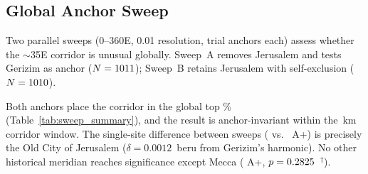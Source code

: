 \documentclass[HARVARD,twocolumn]{USG}
\begin{document}
\subsection{Global Anchor Sweep}
\label{sec:sensitivity_global}

Two parallel sweeps (0--360\textdegree{}E, 0.01\textdegree{} resolution,
\anchorSweepNanchors{} trial anchors each) assess whether the
$\sim$35\textdegree{}E corridor is unusual globally.
Sweep~A removes Jerusalem and tests Gerizim as anchor ($N = 1011$);
Sweep~B retains Jerusalem with self-exclusion ($N = 1010$).

\begin{table}[!t]
\centering\small
\caption{Global anchor sweep: both Levantine anchors ranked within their
  own corpus. Each sweep: \anchorSweepNanchors{} trial anchors,
  0--360\textdegree{}E at 0.01\textdegree{} resolution.
  Sweep~A: N\,=\,\NgerizimSweepCorpus{} (Jerusalem removed); Sweep~B: N\,=\,\NjerSelfExclCorpus{} (Jerusalem self-excluded).
  Gerizim is external in both.
  Mean A+ across all anchors: \anchorSweepApMean{}$\pm$\anchorSweepApStd{}.}
\label{tab:sweep_summary}
\end{table}

Both anchors place the corridor in the global top \anchorSweepTopPct\% 
(Table~\ref{tab:sweep_summary}), and the result
is anchor-invariant within the \GerizimJerusalemKm\,km corridor window.
The single-site difference between sweeps (\GerizimSweepAp{} vs.\ \JerusalemSweepAp{} A+) is precisely
the Old City of Jerusalem ($\delta = 0.0012$~beru from Gerizim's
harmonic). No other historical meridian reaches significance except
Mecca (\MeccaAp{} A+, $p = 0.2825$~$^\dagger$).
\end{document}
